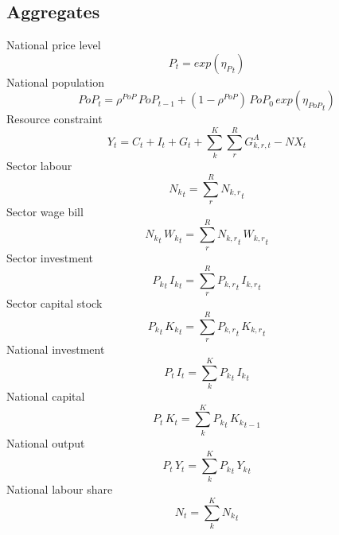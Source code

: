 \subsection{Aggregates}
National price level
\begin{dmath}
{P_{t}}=exp\left({{\eta_{P}}_{t}}\right)
\end{dmath}
National population
\begin{dmath}
{PoP_{t}}={{\rho^{PoP}}}\, {PoP_{t-1}}+\left(1-{{\rho^{PoP}}}\right)\, {{PoP_0}}\, exp\left({{\eta_{PoP}}_{t}}\right)
\end{dmath}
Resource constraint
\begin{dmath}
{Y_{t}}={C_{t}}+{I_{t}}+{G_{t}}+\sum_{k}^{K} \sum_{r}^{R} {G^{A}_{k,r,t}}-{NX_{t}}
\end{dmath}
Sector labour
\begin{dmath}
{{N_k}_{t}}={\sum_{r}^{R} {N_{k,r}}_{t}}
\end{dmath}
Sector wage bill
\begin{dmath}
{{N_k}_{t}}\, {{W_k}_{t}}={\sum_{r}^{R} {N_{k,r}}_{t}}\, {{W_{k,r}}_{t}}
\end{dmath}
Sector investment
\begin{dmath}
{{P_k}_{t}}\, {{I_k}_{t}}={\sum_{r}^{R} {P_{k,r}}_{t}}\, {{I_{k,r}}_{t}}
\end{dmath}
Sector capital stock
\begin{dmath}
{{P_k}_{t}}\, {{K_k}_{t}}={\sum_{r}^{R} {P_{k,r}}_{t}}\, {{K_{k,r}}_{t}}
\end{dmath}
National investment
\begin{dmath}
{P_{t}}\, {I_{t}}={\sum_{k}^{K} {P_k}_{t}}\, {{I_k}_{t}}
\end{dmath}
National capital
\begin{dmath}
{P_{t}}\, {K_{t}}={\sum_{k}^{K} {P_k}_{t}}\, {{K_k}_{t-1}}
\end{dmath}
National output
\begin{dmath}
{P_{t}}\, {Y_{t}}={\sum_{k}^{K} {P_k}_{t}}\, {{Y_k}_{t}}
\end{dmath}
National labour share
\begin{dmath}
{N_{t}}={\sum_{k}^{K} {N_k}_{t}}
\end{dmath}
